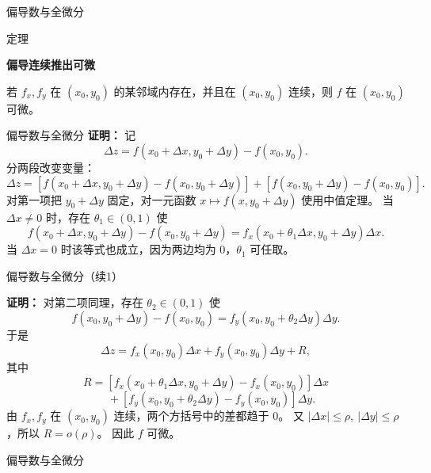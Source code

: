 \documentclass[aspectratio=169,10pt,fontset=fandol]{ctexbeamer}
\begin{document}
\begin{frame}[t,fragile]{偏导数与全微分}
\normalsize
\begin{block}{定理}
{\normalsize
\textbf{偏导连续推出可微}\par

若 $f_x,f_y$ 在 $(x_0,y_0)$ 的某邻域内存在，并且在 $(x_0,y_0)$ 连续，则 $f$ 在 $(x_0,y_0)$ 可微。

}
\end{block}
\end{frame}
\begin{frame}[t,fragile]{偏导数与全微分}
\normalsize
{\normalsize
\textbf{证明：}
记
\[
\Delta z=f(x_0+\Delta x,y_0+\Delta y)-f(x_0,y_0).
\]
分两段改变变量：
\[
\Delta z=[f(x_0+\Delta x,y_0+\Delta y)-f(x_0,y_0+\Delta y)]
+[f(x_0,y_0+\Delta y)-f(x_0,y_0)].
\]
对第一项把 $y_0+\Delta y$ 固定，对一元函数 $x\mapsto f(x,y_0+\Delta y)$ 使用中值定理。 当 $\Delta x\neq0$ 时，存在 $\theta_1\in(0,1)$ 使
\[
f(x_0+\Delta x,y_0+\Delta y)-f(x_0,y_0+\Delta y)
=f_x(x_0+\theta_1\Delta x,y_0+\Delta y)\Delta x.
\]
当 $\Delta x=0$ 时该等式也成立，因为两边均为 $0$，$\theta_1$ 可任取。
}
\end{frame}
\begin{frame}[t,fragile]{偏导数与全微分（续1）}
\small
{\small
\textbf{证明：}
 对第二项同理，存在 $\theta_2\in(0,1)$ 使
\[
f(x_0,y_0+\Delta y)-f(x_0,y_0)
=f_y(x_0,y_0+\theta_2\Delta y)\Delta y.
\]
于是
\[
\Delta z=f_x(x_0,y_0)\Delta x+f_y(x_0,y_0)\Delta y+R,
\]
其中
\[
R=[f_x(x_0+\theta_1\Delta x,y_0+\Delta y)-f_x(x_0,y_0)]\Delta x
\]
\[
\quad+[f_y(x_0,y_0+\theta_2\Delta y)-f_y(x_0,y_0)]\Delta y.
\]
由 $f_x,f_y$ 在 $(x_0,y_0)$ 连续，两个方括号中的差都趋于 $0$。 又 $|\Delta x|\leq\rho,\ |\Delta y|\leq\rho$，所以 $R=o(\rho)$。 因此 $f$ 可微。

}
\end{frame}
\begin{frame}[t,fragile]{偏导数与全微分}
\normalsize
{\normalsize
\begin{center}
\end{center}
}
\end{frame}
\end{document}
